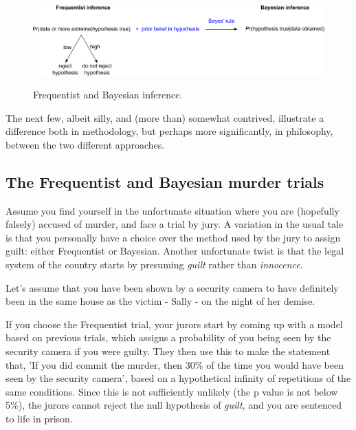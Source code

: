\documentclass[11pt,fullpage]{book}
\begin{document}
\begin{figure}
\centering
\scalebox{0.4} 
{\includegraphics{Intro_BayesVsFrequentist.pdf}}
\caption{Frequentist and Bayesian inference.}\label{fig:Intro_BayesVsFrequentist}
\end{figure}

The next few, albeit silly, and (more than) somewhat contrived, illustrate a difference both in methodology, but perhaps more significantly, in philosophy, between the two different approaches.

\subsection{The Frequentist and Bayesian murder trials}
Assume you find yourself in the unfortunate situation where you are (hopefully falsely) accused of murder, and face a trial by jury. A variation in the usual tale is that you personally have a choice over the method used by the jury to assign guilt: either Frequentist or Bayesian. Another unfortunate twist is that the legal system of the country starts by presuming \textit{guilt} rather than \textit{innocence}.

Let's assume that you have been shown by a security camera to have definitely been in the same house as the victim - Sally - on the night of her demise. 

If you choose the Frequentist trial, your jurors start by coming up with a model based on previous trials, which assigns a probability of you being seen by the security camera if you were guilty. They then use this to make the statement that, 'If you did commit the murder, then 30\% of the time you would have been seen by the security camera', based on a hypothetical infinity of repetitions of the same conditions. Since this is not sufficiently unlikely (the p value is not below 5\%), the jurors cannot reject the null hypothesis of \textit{guilt}, and you are sentenced to life in prison.
\end{document}
